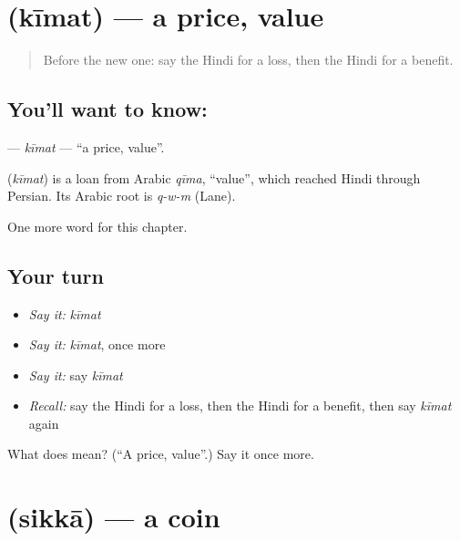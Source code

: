\section[\texorpdfstring{\hi{क़ीमत} (kīmat)}{क़ीमत (kīmat)}]{ (kīmat) — a price, value}

\label{lesson:HI-C208-kimat}



\begin{quote}
Before the new one: say the Hindi for a loss, then the Hindi for a benefit.
\end{quote}

\subsection*{You'll want to know: }
\textbf{} — \emph{kīmat} — \textquotedblleft{}a price, value\textquotedblright{}.

\begin{cousinweb}
\textbf{} (\emph{kīmat}) is a loan from Arabic \emph{qīma}, \textquotedblleft{}value\textquotedblright{}, which reached Hindi through Persian. Its Arabic root is \emph{q-w-m} (Lane).
\end{cousinweb}

\begin{grammarlens}[title={What you've built}]
One more word for this chapter.
\end{grammarlens}

\subsection*{Your turn}
\begin{itemize}
\raggedright
  \item \emph{Say it:} \emph{kīmat}
  \item \emph{Say it:} \emph{kīmat}, once more
  \item \emph{Say it:} say \emph{kīmat}
  \item \emph{Recall:} say the Hindi for a loss, then the Hindi for a benefit, then say \emph{kīmat} again
\end{itemize}

\begin{tcolorbox}[breakable,colback=teal!4,colframe=teal!35!black,title={Before you move on}]
What does  mean? (\textquotedblleft{}A price, value\textquotedblright{}.) Say it once more.
\end{tcolorbox}
\section[\texorpdfstring{\hi{सिक्का} (sikkā)}{सिक्का (sikkā)}]{ (sikkā) — a coin}

